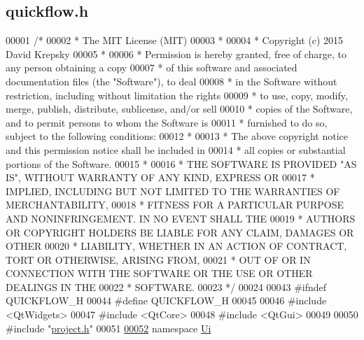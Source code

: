 \hypertarget{quickflow_8h_source}{}\subsection{quickflow.\+h}
\label{quickflow_8h_source}

\begin{DoxyCode}
00001 \textcolor{comment}{/*}
00002 \textcolor{comment}{ * The MIT License (MIT)}
00003 \textcolor{comment}{ *}
00004 \textcolor{comment}{ * Copyright (c) 2015 David Krepsky}
00005 \textcolor{comment}{ *}
00006 \textcolor{comment}{ * Permission is hereby granted, free of charge, to any person obtaining a copy}
00007 \textcolor{comment}{ * of this software and associated documentation files (the "Software"), to deal}
00008 \textcolor{comment}{ * in the Software without restriction, including without limitation the rights}
00009 \textcolor{comment}{ * to use, copy, modify, merge, publish, distribute, sublicense, and/or sell}
00010 \textcolor{comment}{ * copies of the Software, and to permit persons to whom the Software is}
00011 \textcolor{comment}{ * furnished to do so, subject to the following conditions:}
00012 \textcolor{comment}{ *}
00013 \textcolor{comment}{ * The above copyright notice and this permission notice shall be included in}
00014 \textcolor{comment}{ * all copies or substantial portions of the Software.}
00015 \textcolor{comment}{ *}
00016 \textcolor{comment}{ * THE SOFTWARE IS PROVIDED "AS IS", WITHOUT WARRANTY OF ANY KIND, EXPRESS OR}
00017 \textcolor{comment}{ * IMPLIED, INCLUDING BUT NOT LIMITED TO THE WARRANTIES OF MERCHANTABILITY,}
00018 \textcolor{comment}{ * FITNESS FOR A PARTICULAR PURPOSE AND NONINFRINGEMENT. IN NO EVENT SHALL THE}
00019 \textcolor{comment}{ * AUTHORS OR COPYRIGHT HOLDERS BE LIABLE FOR ANY CLAIM, DAMAGES OR OTHER}
00020 \textcolor{comment}{ * LIABILITY, WHETHER IN AN ACTION OF CONTRACT, TORT OR OTHERWISE, ARISING FROM,}
00021 \textcolor{comment}{ * OUT OF OR IN CONNECTION WITH THE SOFTWARE OR THE USE OR OTHER DEALINGS IN THE}
00022 \textcolor{comment}{ * SOFTWARE.}
00023 \textcolor{comment}{ */}
00024 
00043 \textcolor{preprocessor}{#ifndef QUICKFLOW\_H}
00044 \textcolor{preprocessor}{#define QUICKFLOW\_H}
00045 
00046 \textcolor{preprocessor}{#include <QtWidgets>}
00047 \textcolor{preprocessor}{#include <QtCore>}
00048 \textcolor{preprocessor}{#include <QtGui>}
00049 
00050 \textcolor{preprocessor}{#include "\hyperlink{project_8h}{project.h}"}
00051 
\hypertarget{quickflow_8h_source_l00052}{}\hyperlink{namespace_ui}{00052} \textcolor{keyword}{namespace }\hyperlink{namespace_ui}{Ui}

\end{DoxyCode}
